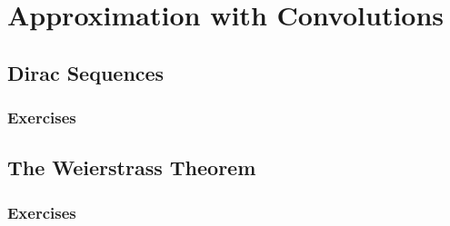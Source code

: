 \setcounter{chapter}{0}
\renewcommand{\thechapter}{11}
\chapter{Approximation with Convolutions}\label{ch:11}
\setcounter{equation}{0}	        %

\section{Dirac Sequences}\label{sec:11.1}
\subsection*{Exercises}\label{sec:11.1_Exercises}
\section{The Weierstrass Theorem}\label{sec:11.2}	
\subsection*{Exercises}\label{sec:11.2_Exercises}
